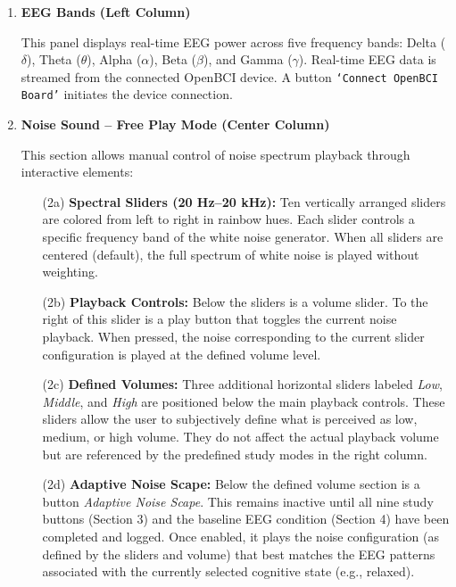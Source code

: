 \begin{enumerate}
\item \textbf{EEG Bands (Left Column)}

This panel displays real-time EEG power across five frequency bands: Delta ($\delta$), Theta ($\theta$), Alpha ($\alpha$), Beta ($\beta$), and Gamma ($\gamma$). Real-time EEG data is streamed from the connected OpenBCI device. A  button \texttt{`Connect OpenBCI Board'} initiates the device connection. \\

\item \textbf{Noise Sound – Free Play Mode (Center Column)}

This section allows manual control of noise spectrum playback through interactive elements:

\begin{enumerate}
  \item[(2a)] \textbf{Spectral Sliders (20 Hz–20 kHz):} Ten vertically arranged sliders are colored from left to right in rainbow hues. Each slider controls a specific frequency band of the white noise generator. When all sliders are centered (default), the full spectrum of white noise is played without weighting.

  \item[(2b)] \textbf{Playback Controls:} Below the sliders is a volume slider. To the right of this slider is a play button that toggles the current noise playback. When pressed, the noise corresponding to the current slider configuration is played at the defined volume level.

  \item[(2c)] \textbf{Defined Volumes:} Three additional horizontal sliders labeled \textit{Low}, \textit{Middle}, and \textit{High} are positioned below the main playback controls. These sliders allow the user to subjectively define what is perceived as low, medium, or high volume. They do not affect the actual playback volume but are referenced by the predefined study modes in the right column.

  \item[(2d)] \textbf{Adaptive Noise Scape:} Below the defined volume section is a button \textit{Adaptive Noise Scape}. This remains inactive until all nine study buttons (Section 3) and the baseline EEG condition (Section 4) have been completed and logged. Once enabled, it plays the noise configuration (as defined by the sliders and volume) that best matches the EEG patterns associated with the currently selected cognitive state (e.g., relaxed). \\
\end{enumerate}


\end{enumerate}
